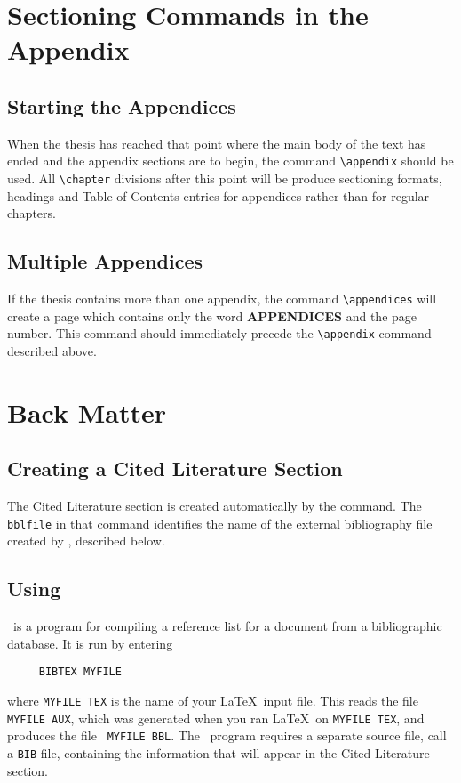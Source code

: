 \section{Sectioning Commands in the Appendix}
\subsection{Starting the Appendices}
When the thesis has reached that point where the main body of
the text has ended and the appendix sections are to begin, the
command \verb+\appendix+ should be used.  All \verb+\chapter+ divisions
after this point will be produce sectioning formats, headings and Table
of Contents entries for appendices rather than for regular chapters.
 
\subsection{Multiple Appendices}
If the thesis contains more than one appendix, the command
\verb+\appendices+ will create a page which contains only the
word {\bf APPENDICES} and the page number.
This command should immediately
precede the \verb+\appendix+ command described above.
 
\section{Back Matter}
\subsection{Creating a Cited Literature Section}
The Cited Literature section is created automatically by the
\verb++ command.  The \verb+bblfile+
in that command identifies the name of the external bibliography file
created by \BibTeX{}, described below.
 
\subsection{Using \BibTeX}
\BibTeX\ is a program for compiling a reference list for a document
from a bibliographic database.  It is run by entering
\begin{verbatim}
     BIBTEX MYFILE
\end{verbatim}
where \mbox{\tt MYFILE TEX} is the name of your \LaTeX\ input file.
This reads the file \mbox{\tt MYFILE AUX}, which was generated when you
ran \LaTeX\ on \mbox{\tt MYFILE TEX}, and produces the file \mbox{\tt
MYFILE BBL}.
The \BibTeX\ program requires a separate source file, call a \verb+BIB+
file, containing the information that will appear in the Cited Literature
section.
 
